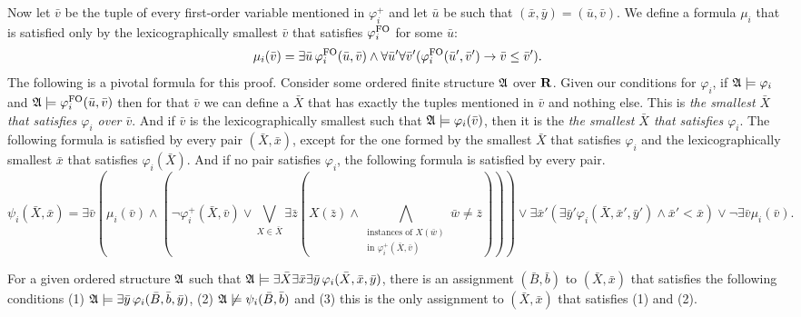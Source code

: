 Now let $\bar{v}$ be the tuple of every first-order variable mentioned in $\varphi_i^{+}$ and let $\bar{u}$ be such that $(\bar{x},\bar{y}) = (\bar{u},\bar{v})$. We define a formula $\mu_i$ that is satisfied only by the lexicographically smallest $\bar{v}$ that satisfies $\varphi_i^{{\rm FO}}$ for some $\bar{u}$:
$$
\mu_i(\bar{v}) = \exists\bar{u}\,\varphi_i^{{\rm FO}}(\bar{u},\bar{v})\wedge\forall\bar{u}'\forall\bar{v}'(\varphi_i^{{\rm FO}}(\bar{u}',\bar{v}')\to\bar{v}\leq\bar{v}').
$$
The following is a pivotal formula for this proof. Consider some ordered finite structure $\mathfrak{A}$ over $\mathbf{R}$. Given our conditions for $\varphi_i$, if $\mathfrak{A}\models\varphi_i$ and $\mathfrak{A}\models\varphi^{{\rm FO}}_i(\bar{u},\bar{v})$ then for that $\bar{v}$ we can define a $\bar{X}$ that has exactly the tuples mentioned in $\bar{v}$ and nothing else. This is {\em the smallest $\bar{X}$ that satisfies $\varphi_i$ over $\bar{v}$}. And if $\bar{v}$ is the lexicographically smallest such that $\mathfrak{A}\models\varphi_i(\bar{v})$, then it is the {\em the smallest $\bar{X}$ that satisfies $\varphi_i$}. The following formula is satisfied by every pair $(\bar{X},\bar{x})$, except for the one formed by the smallest $\bar{X}$ that satisfies $\varphi_i$ and the lexicographically smallest $\bar{x}$ that satisfies $\varphi_i(\bar{X})$. And if no pair satisfies $\varphi_i$, the following formula is satisfied by every pair.
$$
\psi_i(\bar{X},\bar{x}) = \exists\bar{v}(\mu_i(\bar{v})\wedge(\neg\varphi^{+}_i(\bar{X},\bar{v})\vee\bigvee_{X \in \bar{X}} \exists\bar{z}(X(\bar{z}) \wedge \bigwedge\limits_{\substack{\text{instances of }X(\bar{w}) \\ \text{in }\varphi^{+}_i(\bar{X},\bar{v})}}\bar{w}\neq\bar{z}))) \vee \exists\bar{x}'(\exists\bar{y}'\varphi_i(\bar{X},\bar{x}',\bar{y}')\wedge \bar{x}'<\bar{x})\vee\neg\exists\bar{v}\mu_i(\bar{v}) .
$$
\begin{lemma}
	For a given ordered structure $\mathfrak{A}$ such that $\mathfrak{A}\models\exists\bar{X}\exists\bar{x}\exists\bar{y}\,\varphi_i(\bar{X},\bar{x},\bar{y})$, there is an assignment $(\bar{B},\bar{b})$ to $(\bar{X},\bar{x})$ that satisfies the following conditions (1) $\mathfrak{A}\models\exists\bar{y}\,\varphi_i(\bar{B},\bar{b},\bar{y})$, (2) $\mathfrak{A}\not\models\psi_i(\bar{B},\bar{b})$ and (3) this is the only assignment to $(\bar{X},\bar{x})$ that satisfies (1) and (2).
\end{lemma}
